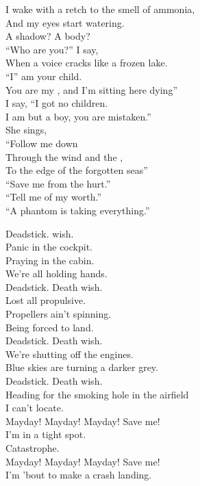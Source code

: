 
I wake with a retch to the smell of ammonia, \\
And my eyes start watering. \\
A shadow? A body? \\
``Who are you?'' I say, \\
When a voice cracks like a frozen lake. \\
``I'' am your child. \\
You are my , and I'm sitting here dying'' \\
I say, ``I got no children. \\
I am but a boy, you are mistaken.'' \\

She sings, \\
``Follow me down \\
Through the wind and the , \\
To the edge of the forgotten seas'' \\
``Save me from the hurt.'' \\
``Tell me of my worth.'' \\
``A phantom is taking everything.'' \\


Deadstick.  wish. \\
Panic in the cockpit. \\
Praying in the cabin. \\
We're all holding hands. \\
Deadstick. Death wish. \\
Lost all propulsive. \\
Propellers ain't spinning. \\
Being forced to land. \\

Deadstick. Death wish. \\
We're shutting off the engines. \\
Blue skies are turning a darker grey. \\
Deadstick. Death wish. \\
Heading for the smoking hole in the airfield \\
I can't locate. \\

Mayday! Mayday! Mayday! Save me! \\
I'm in a tight spot. \\
Catastrophe. \\
Mayday! Mayday! Mayday! Save me! \\
I'm 'bout to make a crash landing. \\

